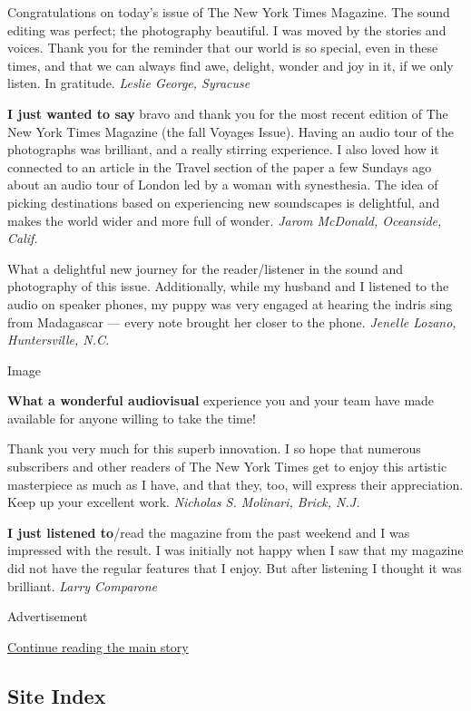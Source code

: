 Congratulations on today's issue of The New York Times Magazine. The
sound editing was perfect; the photography beautiful. I was moved by the
stories and voices. Thank you for the reminder that our world is so
special, even in these times, and that we can always find awe, delight,
wonder and joy in it, if we only listen. In gratitude. \emph{Leslie
George, Syracuse}

\textbf{I just wanted to say} bravo and thank you for the most recent
edition of The New York Times Magazine (the fall Voyages Issue). Having
an audio tour of the photographs was brilliant, and a really stirring
experience. I also loved how it connected to an article in the Travel
section of the paper a few Sundays ago about an audio tour of London led
by a woman with synesthesia. The idea of picking destinations based on
experiencing new soundscapes is delightful, and makes the world wider
and more full of wonder. \emph{Jarom McDonald, Oceanside, Calif.}

What a delightful new journey for the reader/listener in the sound and
photography of this issue. Additionally, while my husband and I listened
to the audio on speaker phones, my puppy was very engaged at hearing the
indris sing from Madagascar --- every note brought her closer to the
phone. \emph{Jenelle Lozano, Huntersville, N.C.}

Image

\textbf{What a wonderful audiovisual} experience you and your team have
made available for anyone willing to take the time!

Thank you very much for this superb innovation. I so hope that numerous
subscribers and other readers of The New York Times get to enjoy this
artistic masterpiece as much as I have, and that they, too, will express
their appreciation. Keep up your excellent work. \emph{Nicholas S.
Molinari, Brick, N.J.}

\textbf{I just listened to}/read the magazine from the past weekend and
I was impressed with the result. I was initially not happy when I saw
that my magazine did not have the regular features that I enjoy. But
after listening I thought it was brilliant. \emph{Larry Comparone}

Advertisement

\protect\hyperlink{after-bottom}{Continue reading the main story}

\hypertarget{site-index}{%
\subsection{Site Index}\label{site-index}}


